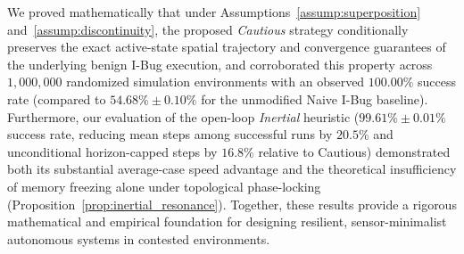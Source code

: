 \documentclass[12pt, a4paper]{article}
\begin{document}
We proved mathematically that under Assumptions~\ref{assump:superposition} and~\ref{assump:discontinuity}, the proposed \textit{Cautious} strategy conditionally preserves the exact active-state spatial trajectory and convergence guarantees of the underlying benign I-Bug execution, and corroborated this property across $1,000,000$ randomized simulation environments with an observed $100.00\%$ success rate (compared to $54.68\% \pm 0.10\%$ for the unmodified Naive I-Bug baseline). Furthermore, our evaluation of the open-loop \textit{Inertial} heuristic ($99.61\% \pm 0.01\%$ success rate, reducing mean steps among successful runs by $20.5\%$ and unconditional horizon-capped steps by $16.8\%$ relative to Cautious) demonstrated both its substantial average-case speed advantage and the theoretical insufficiency of memory freezing alone under topological phase-locking (Proposition~\ref{prop:inertial_resonance}). Together, these results provide a rigorous mathematical and empirical foundation for designing resilient, sensor-minimalist autonomous systems in contested environments.
\end{document}
